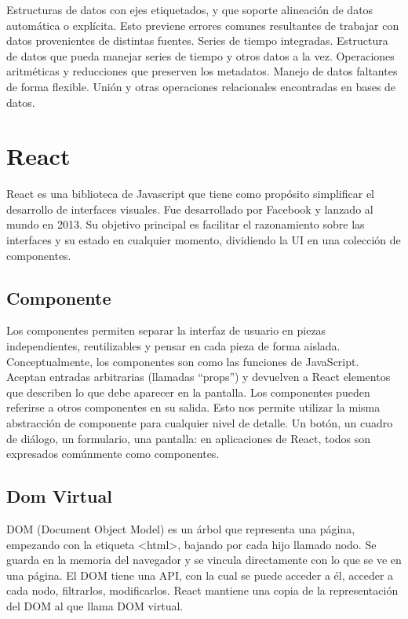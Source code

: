\begin{outline}
    \1 Estructuras de datos con ejes etiquetados, y que soporte alineación de datos automática o explícita. Esto previene errores comunes resultantes de trabajar con datos provenientes de distintas fuentes.
    \1 Series de tiempo integradas.
    \1 Estructura de datos que pueda manejar series de tiempo y otros datos a la vez.
    \1 Operaciones aritméticas y reducciones que preserven los metadatos.
    \1 Manejo de datos faltantes de forma flexible.
    \1 Unión y otras operaciones relacionales encontradas en bases de datos.
\end{outline}

\section[React]{React}

React es una biblioteca de Javascript que tiene como propósito simplificar el desarrollo de interfaces visuales.
Fue desarrollado por Facebook y lanzado al mundo en 2013.
Su objetivo principal es facilitar el razonamiento sobre las interfaces y su estado en cualquier momento, dividiendo la UI en una colección de componentes.

\subsection[Componente]{Componente}

Los componentes permiten separar la interfaz de usuario en piezas independientes, reutilizables y pensar en cada pieza de forma aislada.
Conceptualmente, los componentes son como las funciones de JavaScript. Aceptan entradas arbitrarias (llamadas “props”) y devuelven a React elementos que describen lo que debe aparecer en la pantalla.
Los componentes pueden referirse a otros componentes en su salida. Esto nos permite utilizar la misma abstracción de componente para cualquier nivel de detalle. Un botón, un cuadro de diálogo, un formulario, una pantalla: en aplicaciones de React, todos son expresados comúnmente como componentes.


\subsection[DOM Virtual]{Dom Virtual}

DOM (Document Object Model) es un árbol que representa una página, empezando con la etiqueta <html>, bajando por cada hijo llamado nodo.
Se guarda en la memoria del navegador y se vincula directamente con lo que se ve en una página. El DOM tiene una API, con la cual se puede acceder a él, acceder a cada nodo, filtrarlos, modificarlos.
React mantiene una copia de la representación del DOM al que llama DOM virtual.


